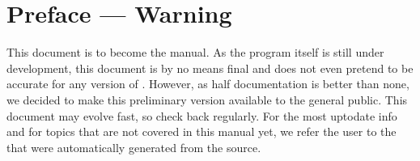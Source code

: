 \chapter*{Preface --- Warning}
\label{preface}
This document is to become the \pyformex manual. As the \pyformex program itself is still under development, this document is by no means final and does not even pretend to be accurate for any version of \pyformex. 
However, as half documentation is better than none, we decided to make this preliminary version available to the general public. This document may evolve fast, so check back regularly.
For the most uptodate info and for topics that are not covered in this manual yet, we refer the user to the  that were automatically generated from the \pyf source.

